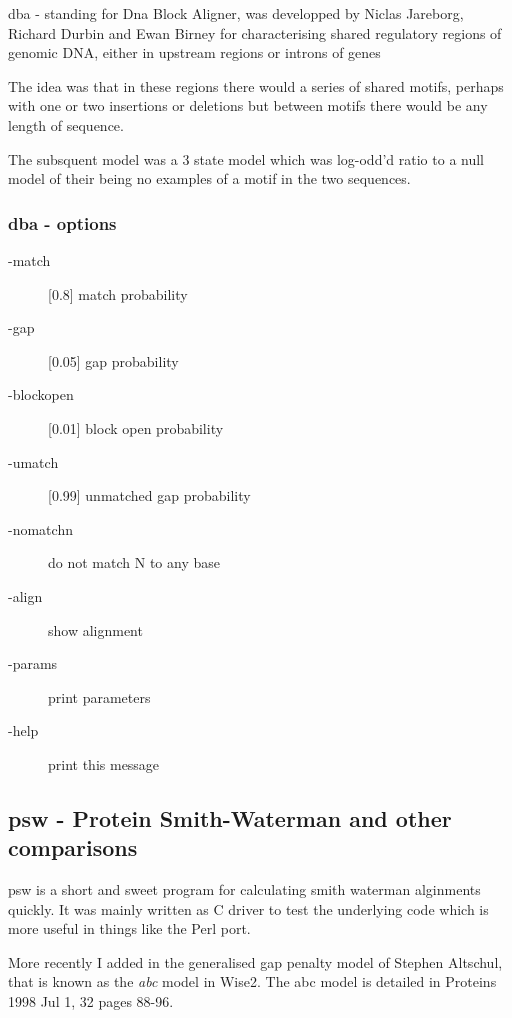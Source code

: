 \documentclass{article}
\begin{document}
dba - standing for Dna Block Aligner, was developped by Niclas Jareborg,
Richard Durbin and Ewan Birney for characterising shared regulatory regions
of genomic DNA, either in upstream regions or introns of genes

The idea was that in these regions there would a series of shared motifs,
perhaps with one or two insertions or deletions but between motifs there
would be any length of sequence. 

The subsquent model was a 3 state model which was log-odd'd ratio to a null
model of their being no examples of a motif in the two sequences.

\subsubsection{dba - options}
\begin{description}
\item[-match] [0.8]      match probability
\item[-gap] [0.05]       gap probability
\item[-blockopen] [0.01] block open probability
\item[-umatch] [0.99]    unmatched gap probability
\item[-nomatchn]         do not match N to any base
\item[-align]            show alignment
\item[-params]           print parameters
\item[-help]            print this message
\end{description}

\subsection{psw - Protein Smith-Waterman and other comparisons}
\label{sec:psw}

psw is a short and sweet program for calculating smith waterman alginments
quickly. It was mainly written as C driver to test the underlying code which
is more useful in things like the Perl port. 

More recently I added in the generalised gap penalty model of Stephen
Altschul, that is known as the \emph{abc} model in Wise2.  The abc
model is detailed in Proteins 1998 Jul 1, 32 pages 88-96.
\end{document}
